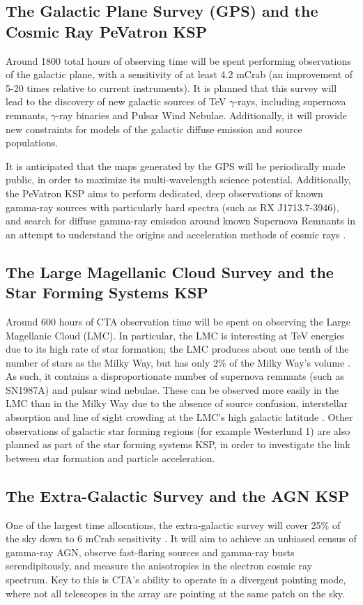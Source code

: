 \subsection{The Galactic Plane Survey (GPS) and the Cosmic Ray PeVatron KSP}
Around 1800 total hours of observing time will be spent performing observations of the galactic plane, with a sensitivity of at least 4.2 mCrab \cite{scienceCTA} (an improvement of 5-20 times relative to current instruments). It is planned that this survey will lead to the discovery of new galactic sources of TeV $\gamma$-rays, including supernova remnants, $\gamma$-ray binaries and Pulsar Wind Nebulae. Additionally, it will provide new constraints for models of the galactic diffuse emission and source populations. 

It is anticipated that the maps generated by the GPS will be periodically made public, in order to maximize its multi-wavelength science potential.
Additionally, the PeVatron KSP aims to perform dedicated, deep observations of known gamma-ray sources with particularly hard spectra (such as RX J1713.7-3946), and search for diffuse gamma-ray emission around known Supernova Remnants in an attempt to understand the origins and acceleration methods of cosmic rays \cite{scienceCTA}.

\subsection{The Large Magellanic Cloud Survey and the Star Forming Systems KSP} Around 600 hours of CTA observation time will be spent on observing the Large Magellanic Cloud (LMC). In particular, the LMC is interesting at TeV energies due to its high rate of star formation; the LMC produces about one tenth of the number of stars as the Milky Way, but has only 2\% of the Milky Way's volume \cite{scienceCTA}.
As such, it contains a disproportionate number of supernova remnants (such as SN1987A) and pulsar wind nebulae.  These can be observed more easily in the LMC than in the Milky Way due to the absence of source confusion, interstellar absorption and line of sight crowding at the LMC's high galactic latitude \cite{scienceCTA}. Other observations of galactic star forming regions (for example Westerlund 1) are also planned as part of the star forming systems KSP, in order to investigate the link between star formation and particle acceleration.

\subsection{The Extra-Galactic Survey and the AGN KSP} One of the largest time allocations, the extra-galactic survey will cover 25\% of the sky down to 6 mCrab sensitivity \cite{scienceCTA}. It will aim to achieve an unbiased census of gamma-ray AGN, observe fast-flaring sources and gamma-ray busts serendipitously, and measure the anisotropies in the electron cosmic ray spectrum. Key to this is CTA's ability to operate in a divergent pointing mode, where not all telescopes in the array are pointing at the same patch on the sky. 

